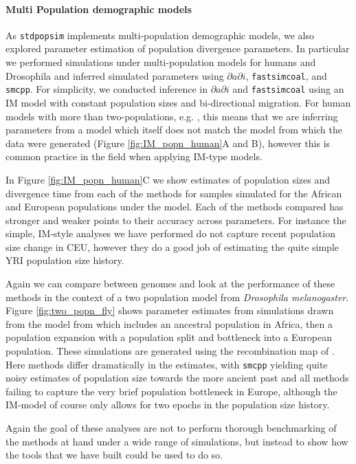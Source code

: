 \documentclass[12pt,halfline,a4paper]{ouparticle}
\newcommand{\dadi}{$\partial a \partial i$\xspace}
\newcommand{\smcpp}{\texttt{smcpp}\xspace}
\newcommand{\fastsimcoal}{\texttt{fastsimcoal}\xspace}
\begin{document}
\paragraph*{Multi Population demographic models}
As \texttt{stdpopsim} implements multi-population demographic models, we also
explored parameter estimation of population divergence parameters. In particular
we performed simulations under multi-population models for humans and Drosophila
and inferred simulated parameters using \dadi, \fastsimcoal, and \smcpp.
For simplicity, we conducted inference in \dadi and \fastsimcoal using an IM model
with constant population sizes and bi-directional migration. For human
models with more than two-populations, e.g. \cite{gutenkunst2009inferring},
this means that we are inferring parameters from a model which itself does
not match the model from which the data were generated (Figure
\ref{fig:IM_popn_human}A and B), however this is common practice in the field
when applying IM-type models.

In Figure \ref{fig:IM_popn_human}C we show estimates of population sizes and divergence
time from each of the methods for samples simulated for the African and European populations
under the \cite{gutenkunst2009inferring} model. Each of the methods compared has stronger
and weaker points to their accuracy across parameters. For instance the simple, IM-style
analyses we have performed do not capture recent population size change in CEU, however
they do a good job of estimating the quite simple YRI population size history.

Again we can compare between genomes and look at the performance of these methods in
the context of a two population model from \emph{Drosophila melanogaster}. Figure
\ref{fig:two_popn_fly} shows parameter estimates from simulations drawn from
the model from \cite{li2006inferring} which includes
an ancestral population in Africa, then a population expansion with a population
split and bottleneck into a European population. These simulations are generated
using the recombination map of \cite{comeron2012many}. Here methods differ dramatically
in the estimates, with \smcpp yielding quite noisy estimates of population size
towards the more ancient past and all methods failing to capture the very brief
population bottleneck in Europe, although the IM-model of course only allows for
two epochs in the population size history.

Again the goal of these analyses are not to perform thorough benchmarking of
the methods at hand under a wide range of simulations, but instead to show how
the tools that we have built could be used to do so.
\end{document}
